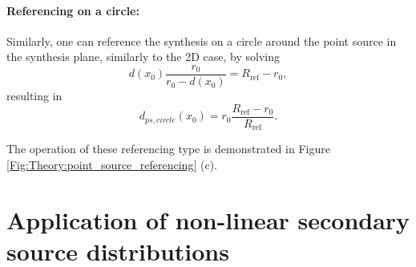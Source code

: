 \documentclass[12pt,a4paper]{article}
\begin{document}
\paragraph{Referencing on a circle:\\}
Similarly, one can reference the synthesis on a circle around the point source in the synthesis plane, similarly to the 2D case, by solving 
\begin{equation}
d(x_0)\frac{r_0}{r_0 - d(x_0)} = R_{\mathrm{ref}} - r_0,
\end{equation}
resulting in
\begin{equation}
d_{ps,circle}(x_0)  = r_0 \frac{R_{\mathrm{ref}} - r_0}{R_{\mathrm{ref}}}.
\end{equation}

The operation of these referencing type is demonstrated in Figure \ref{Fig:Theory:point_source_referencing} (c).

\section{Application of non-linear secondary source distributions}
\end{document}
